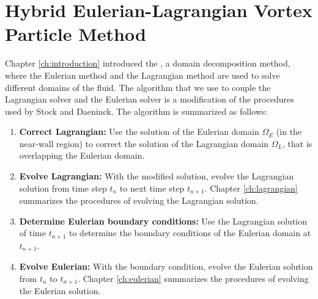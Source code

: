 \chapter{Hybrid Eulerian-Lagrangian Vortex Particle Method}
\label{ch:hybrid}


Chapter \ref{ch:introduction} introduced the , a domain decomposition method, where the Eulerian method and the Lagrangian method are used to solve different domains of the fluid.  The algorithm that we use to couple the Lagrangian solver and the Eulerian solver is a modification of the procedures used by Stock and Daeninck. The algorithm is summarized as follows:

	\begin{enumerate}
	\item \textbf{Correct Lagrangian:} Use the solution of the Eulerian domain $\Omega_E$ (in the near-wall region) to correct the solution of the Lagrangian domain $\Omega_L$, that is overlapping the Eulerian domain.
	
	\item \textbf{Evolve Lagrangian:} With the modified solution, evolve the Lagrangian solution from time step $t_n$ to next time step $t_{n+1}$. Chapter \ref{ch:lagrangian} summarizes the procedures of evolving the Lagrangian solution.
	
	\item \textbf{Determine Eulerian boundary conditions:} Use the Lagrangian solution of time $t_{n+1}$ to determine the boundary conditions of the Eulerian domain at $t_{n+1}$.
	
	\item \textbf{Evolve Eulerian:} With the boundary condition, evolve the Eulerian solution from $t_n$ to $t_{n+1}$. Chapter \ref{ch:eulerian} summarizes the procedures of evolving the Eulerian solution.
	\end{enumerate}

